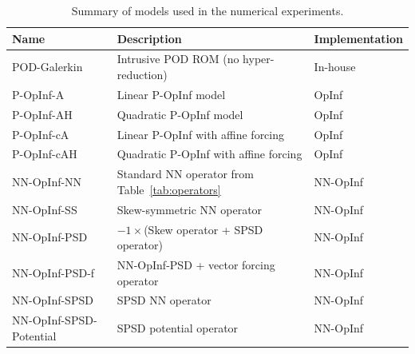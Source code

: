 \documentclass[3p,computermodern,11pt]{elsarticle}
\numberwithin{equation}{section}
\begin{document}
\begin{table}[t]
    \centering
    \caption{Summary of models used in the numerical experiments.}
    \label{tab:model_summary}
    \begin{tabularx}{\textwidth}{@{}l X l@{}}
        \toprule
        \textbf{Name} & \textbf{Description} & \textbf{Implementation} \\
        \midrule
        POD-Galerkin & Intrusive POD ROM (no hyper-reduction) & In-house \\
        P-OpInf-A & Linear P-OpInf model & OpInf~\cite{OpInfPackage} \\
        P-OpInf-AH & Quadratic P-OpInf model & OpInf~\cite{OpInfPackage} \\
        P-OpInf-cA & Linear P-OpInf with affine forcing & OpInf~\cite{OpInfPackage} \\
        P-OpInf-cAH & Quadratic P-OpInf with affine forcing & OpInf~\cite{OpInfPackage} \\
        NN-OpInf-NN & Standard NN operator from Table~\ref{tab:operators} & NN-OpInf~\cite{nnopinf} \\
        NN-OpInf-SS & Skew-symmetric NN operator & NN-OpInf~\cite{nnopinf} \\
        NN-OpInf-PSD & $-1\times$(Skew operator + SPSD operator) & NN-OpInf~\cite{nnopinf} \\
        NN-OpInf-PSD-f & NN-OpInf-PSD + vector forcing operator & NN-OpInf~\cite{nnopinf} \\
        NN-OpInf-SPSD & SPSD NN operator & NN-OpInf~\cite{nnopinf} \\
        NN-OpInf-SPSD-Potential & SPSD potential operator & NN-OpInf~\cite{nnopinf} \\
        \bottomrule
    \end{tabularx}
\end{table}
\end{document}
